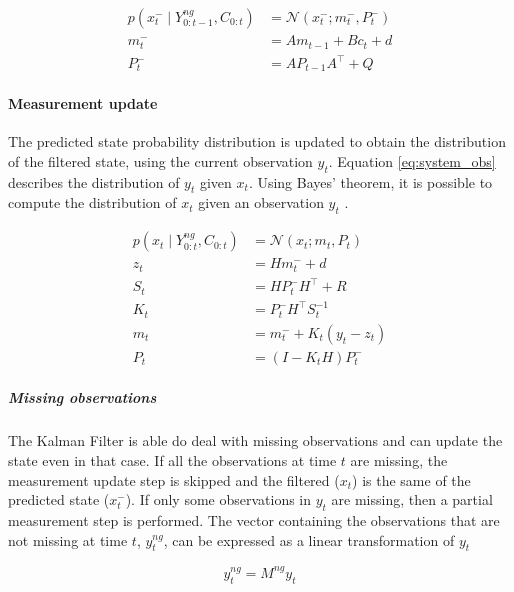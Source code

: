 \documentclass{article}
\newcommand{\norm}[3]{\mathcal{N}\left(#1; #2, #3\right)} %
\begin{document}
\begin{equation}
\begin{aligned}\label{eq:time_update}
    p(x^-_t \mid Y^{ng}_{0:t-1}, C_{0:t}) &= \norm{x_t^-}{m_t^-}{ P_t^-}\\
    m_t^- &= Am_{t-1} + B c_t + d \\
    P_t^- &= AP_{t-1}A^\top + Q
\end{aligned}
\end{equation}

\paragraph{Measurement update}

The predicted state probability distribution is updated to obtain the distribution of the filtered state, using the current observation $y_t$. Equation \ref{eq:system_obs} describes the distribution of $y_t$ given $x_t$. Using Bayes' theorem, it is possible to compute the distribution of $x_t$ given an observation $y_t$ \cite{bishop_pattern_2006, 2020_hennig_pml}.

\begin{equation}
\begin{aligned}
     p(x_t \mid Y^{ng}_{0:t}, C_{0:t}) &= \mathcal{N}(x_t; m_t, P_t) \label{eq:meas_update}\\
     z_t &= Hm_t^- + d \\
     S_t &= HP_t^-H^\top + R \\
     K_t &= P_t^-H^\top S_t^{-1} \\
     m_t &= m_t^- + K_t(y_t - z_t) \\
     P_t &= (I-K_tH)P_t^- 
\end{aligned}
\end{equation}
    
\subparagraph{Missing observations}

The Kalman Filter is able do deal with missing observations and can update the state even in that case. 
If all the observations at time $t$ are missing, the measurement update step is skipped and the filtered ($x_t$) is the same of the predicted state ($x_t^-$). If only some observations in $y_t$ are missing, then a partial measurement step is performed.
The vector containing the observations that are not missing at time $t$, $y^{ng}_t$, can be expressed as a linear transformation of $y_t$

\begin{equation}\label{eq:miss_obs}
    y^{ng}_t = M^{ng}y_t
\end{equation}
\end{document}
